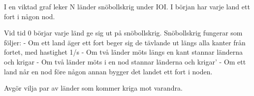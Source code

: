 
I en viktad graf leker N länder snöbollskrig under IOI. I början har varje land ett fort i någon nod.

Vid tid 0 börjar varje länd ge sig ut på snöbollskrig. Snöbollskrig fungerar som följer: - Om ett land äger ett fort beger sig de tävlande ut längs alla kanter från fortet, med hastighet 1/s
- Om två länder möts längs en kant stannar länderna och krigar
- Om två länder möts i en nod stannar länderna och krigar'
- Om ett land når en nod före någon annan bygger det landet ett fort i noden.

Avgör vilja par av länder som kommer kriga mot varandra.







